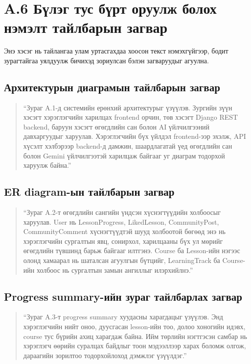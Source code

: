\section*{A.6 Бүлэг тус бүрт оруулж болох нэмэлт тайлбарын загвар}
Энэ хэсэг нь тайлангаа улам уртасгахдаа хоосон текст нэмэхгүйгээр, бодит зурагтайгаа уялдуулж бичихэд зориулсан бэлэн загваруудыг агуулна.

\subsection*{Архитектурын диаграмын тайлбарын загвар}
\begin{quote}
``Зураг A.1-д системийн ерөнхий архитектурыг үзүүлэв. Зургийн зүүн хэсэгт хэрэглэгчийн харилцах frontend орчин, төв хэсэгт Django REST backend, баруун хэсэгт өгөгдлийн сан болон AI үйлчилгээний давхаргуудыг харуулав. Хэрэглэгчийн бүх үйлдэл frontend-ээр эхэлж, API хүсэлт хэлбэрээр backend-д дамжин, шаардлагатай үед өгөгдлийн сан болон Gemini үйлчилгээтэй харилцаж байгааг уг диаграм тодорхой харуулж байна.''
\end{quote}

\subsection*{ER diagram-ын тайлбарын загвар}
\begin{quote}
``Зураг A.2-т өгөгдлийн сангийн үндсэн хүснэгтүүдийн холбоосыг харуулав. User нь LessonProgress, LikedLesson, CommunityPost, CommunityComment хүснэгтүүдтэй шууд холбоотой бөгөөд энэ нь хэрэглэгчийн сургалтын явц, сонирхол, харилцааны бүх ул мөрийг өгөгдлийн түвшинд барьж байгааг илтгэнэ. Course ба Lesson-ийн нэгээс олонд хамаарал нь шаталсан агуулгын бүтцийг, LearningTrack ба Course-ийн холбоос нь сургалтын замын ангиллыг илэрхийлнэ.''
\end{quote}

\subsection*{Progress summary-ийн зураг тайлбарлах загвар}
\begin{quote}
``Зураг A.3-т progress summary хуудасны харагдацыг үзүүлэв. Энд хэрэглэгчийн нийт оноо, дуусгасан lesson-ийн тоо, долоо хоногийн идэвх, course тус бүрийн ахиц харагдаж байна. Ийм төрлийн нэгтгэсэн самбар нь хэрэглэгч өөрийн суралцах байдлыг тоон мэдээллээр харах боломж олгож, дараагийн зорилтоо тодорхойлоход дэмжлэг үзүүлдэг.''
\end{quote}

